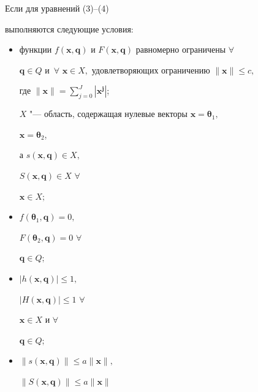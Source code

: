 \begin{theorem}

Если для уравнений {\rm (3)--(4)}

выполняются следующие условия:

\begin{itemize}

 



\item[\small \rm T1)]

функции $f(\boldsymbol x, \boldsymbol q)$ и $F(\boldsymbol x, \boldsymbol q)$ равномерно ограничены $\forall$

$\boldsymbol q\in Q$ и~$\forall$ \mbox{$\boldsymbol x\in X,$} удовлетворяющих ограничению $\| \boldsymbol x \|\leqslant c,$

где $\| \boldsymbol x\|=\sum\limits_{j=0}^J | \boldsymbol x^{\boldsymbol j} | $;

$X$ "--- область, содержащая нулевые векторы $\boldsymbol x=\boldsymbol \theta _1 ,$

$\boldsymbol x=\boldsymbol \theta _2 $, 

а $s(\boldsymbol x, \boldsymbol q)\in X,$

$S(\boldsymbol x, \boldsymbol q)\in X$ $\forall$

$\boldsymbol x\in X;$



\item[\small \rm T2)]

$f(\boldsymbol \theta_1, \boldsymbol q)=0,$

$F(\boldsymbol \theta_2, \boldsymbol q)=0$ $\forall$

$\boldsymbol q\in Q;$



\item[\small \rm T3)]

$| h(\boldsymbol x, \boldsymbol q) |\leqslant 1,$

$\left| H(\boldsymbol x, \boldsymbol q) \right|\leqslant 1$ $\forall$

$\boldsymbol x\in X$ и $\forall$

$\boldsymbol q\in Q;$



\item[\small \rm T4)]

$\| s(\boldsymbol x, \boldsymbol q) \|\leqslant a \| \boldsymbol x \|,$

$\| S(\boldsymbol x, \boldsymbol q) \|\leqslant a \| \boldsymbol x \|$


\end{itemize}
\end{theorem}
